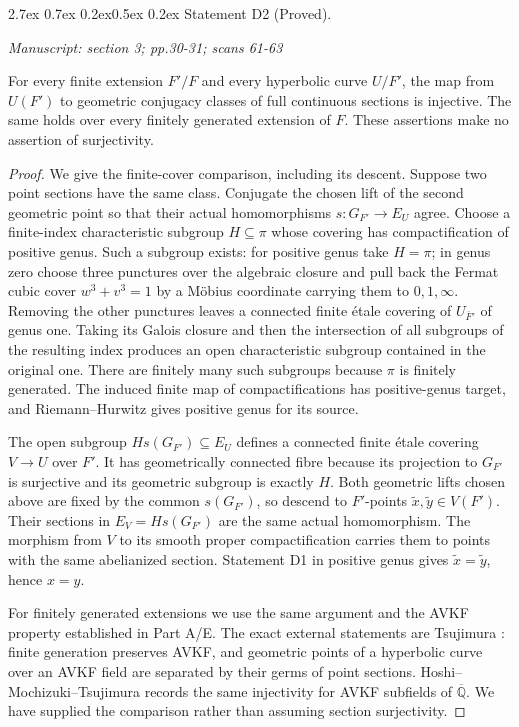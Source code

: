 \documentclass[11pt,a4paper]{article}
\makeatletter
\newcommand{\passage}[1]{\par\smallskip\noindent\textit{Manuscript: #1}\par\smallskip}
\renewcommand\paragraph{\@startsection{paragraph}{4}{\z@}%
  {2.7ex \@plus 0.7ex \@minus 0.2ex}{0.5ex \@plus 0.2ex}%
  {\normalfont\normalsize\bfseries}}
\makeatother
\begin{document}

\paragraph{Statement D2 (Proved).}\label{res:D2}
\passage{section 3; pp.30-31; scans 61-63}

For every finite extension $F'/F$ and every hyperbolic curve $U/F'$, the
map from $U(F')$ to geometric conjugacy classes of full continuous sections
is injective.  The same holds over every finitely generated extension of
$F$.  These assertions make no assertion of surjectivity.

\begin{proof}
We give the finite-cover comparison, including its descent.  Suppose two
point sections have the same class.  Conjugate the chosen lift of the
second geometric point so that their actual homomorphisms
$s:G_{F'}\to E_U$ agree.  Choose a finite-index characteristic subgroup
$H\subseteq\pi$ whose covering has compactification of positive genus.
Such a subgroup exists: for positive genus take $H=\pi$; in genus zero
choose three punctures over the algebraic closure and pull back the
Fermat cubic cover $w^3+v^3=1$ by a M\"obius coordinate carrying them to
$0,1,\infty$.  Removing the other punctures leaves a connected finite
\'etale covering of $U_{\overline F'}$ of genus one.  Taking its Galois
closure and then the intersection of all subgroups of the resulting
index produces an open characteristic subgroup contained in the original
one.  There are finitely many such subgroups because $\pi$ is finitely
generated.  The induced finite map of compactifications has positive-genus
target, and Riemann--Hurwitz gives positive genus for its source.

The open subgroup $H s(G_{F'})\subseteq E_U$ defines a connected finite
\'etale covering $V\to U$ over $F'$.  It has geometrically connected fibre
because its projection to $G_{F'}$ is surjective and its geometric subgroup
is exactly $H$.  Both geometric lifts chosen above are fixed by the common
$s(G_{F'})$, so descend to $F'$-points $\widetilde x,\widetilde y\in V(F')$.
Their sections in $E_V=H s(G_{F'})$ are the same actual homomorphism.
The morphism from $V$ to its smooth proper compactification carries them
to points with the same abelianized section.  Statement D1 in positive
genus gives $\widetilde x=\widetilde y$, hence $x=y$.

For finitely generated extensions we use the same argument and the AVKF
property established in Part A/E.  The exact external statements are
Tsujimura \cite[Proposition 1.2(ii), Proposition 4.2]{D_Tsujimura2022}:
finite generation preserves AVKF, and geometric points of a hyperbolic
curve over an AVKF field are separated by their germs of point sections.
Hoshi--Mochizuki--Tsujimura \cite[Definition 3.3(vi), Proposition 6.4]{D_HMT}
records the same injectivity for AVKF subfields of $\overline{\mathbb Q}$.
We have supplied the comparison rather than assuming section surjectivity.
\end{proof}
\end{document}

